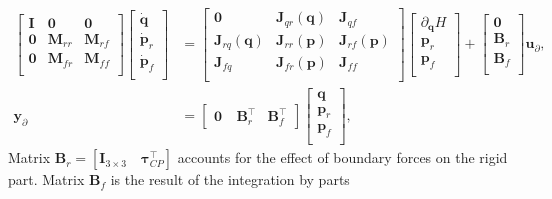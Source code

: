 \begin{equation}
\label{eq:EB_sys}
\begin{aligned}
\begin{bmatrix}
\mathbf{I} & \mathbf{0} & \mathbf{0} \\
\mathbf{0} & \mathbf{M}_{rr} & \mathbf{M}_{rf}\\ 
\mathbf{0} & \mathbf{M}_{fr} & \mathbf{M}_{ff}\\
\end{bmatrix} 
\begin{bmatrix}
\dot{\mathbf{q}} \\ 
\dot{\mathbf{p}}_{r} \\ 
\dot{\mathbf{p}}_{f} \\ 
\end{bmatrix} &= 
\begin{bmatrix}
\mathbf{0} & \mathbf{J}_{qr}(\mathbf{q}) & \mathbf{J}_{qf} \\
\mathbf{J}_{rq}(\mathbf{q}) & \mathbf{J}_{rr}(\mathbf{p}) & \mathbf{J}_{rf}(\mathbf{p})\\ 
\mathbf{J}_{fq} & \mathbf{J}_{fr}(\mathbf{p}) & \mathbf{J}_{ff}\\
\end{bmatrix}  
\begin{bmatrix}
\partial_{\mathbf{q}} H \\
{\mathbf{p}}_{r} \\ 
{\mathbf{p}}_{f} \\ 
\end{bmatrix} + 
\begin{bmatrix}
\mathbf{0} \\
\mathbf{B}_{r} \\ 
\mathbf{B}_{f} \\ 
\end{bmatrix}
\mathbf{u}_\partial, \\
\mathbf{y}_\partial &= \begin{bmatrix}
\mathbf{0} \ & \mathbf{B}_{r}^\top & \mathbf{B}_{f}^\top  
\end{bmatrix} \begin{bmatrix}
\mathbf{q} \\
{\mathbf{p}}_{r} \\ 
{\mathbf{p}}_{f} \\ 
\end{bmatrix},
\end{aligned}
\end{equation}
Matrix $\mathbf{B}_{r} = [\mathbf{I}_{3\times 3} \quad \bm\tau_{CP}^\top]$ accounts for the effect of boundary forces on the rigid part. Matrix $\mathbf{B}_{f}$  is the result of the integration by parts
